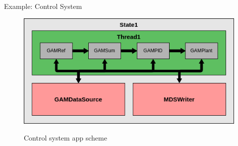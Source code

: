 \begin{frame}{Example: Control System}
	\begin{figure}
		\centering
		\includegraphics[scale=0.55]{ControlSystem.png}
		\label{fig:control}
		\caption{Control system app scheme}
	\end{figure}
\end{frame}

